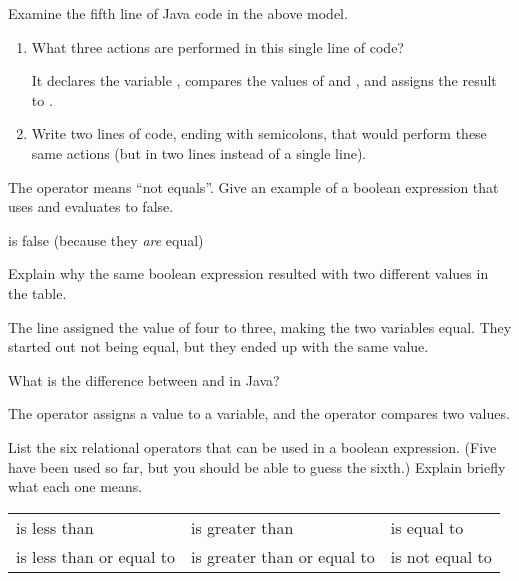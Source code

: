 \Q Examine the fifth line of Java code in the above model.

\begin{enumerate}

\item What three actions are performed in this single line of code?

\begin{answer}[2em]
It declares the variable , compares the values of  and , and assigns the result to .
\end{answer}

\item Write two lines of code, ending with semicolons, that would perform these same actions (but in two lines instead of a single line).



\end{enumerate}


\Q The \java{!=} operator means ``not equals''.
Give an example of a boolean expression that uses \java{!=} and evaluates to false.

\begin{answer}[2em]
 is false (because they {\it are} equal)
\end{answer}


\Q Explain why the same boolean expression  resulted with two different values in the table.

\begin{answer}
The line  assigned the value of four to three, making the two variables equal.
They started out not being equal, but they ended up with the same value.
\end{answer}


\Q What is the difference between \java{=} and \java{==} in Java?

\begin{answer}
The \java{=} operator assigns a value to a variable, and the \java{==} operator compares two values.
\end{answer}


\Q List the six relational operators that can be used in a boolean expression.
(Five have been used so far, but you should be able to guess the sixth.)
Explain briefly what each one means.

\begin{answer}
\begin{tabular}{lll}
\java{<} is less than              & \java{>} is greater than              & \java{==} is equal to     \\
\java{<=} is less than or equal to & \java{>=} is greater than or equal to & \java{!=} is not equal to \\
\end{tabular}
\end{answer}
